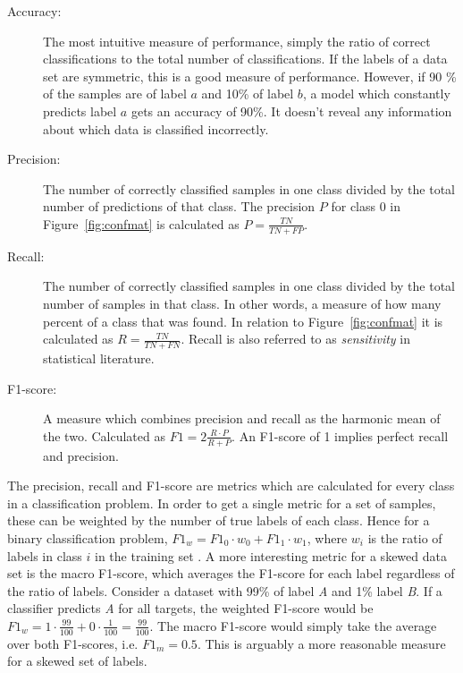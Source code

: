 \begin{description}
    \item[Accuracy:] The most intuitive measure of performance, simply the ratio of correct classifications to the total number of classifications. If the labels of a data set are symmetric, this is a good measure of performance. However, if 90 \%  of the samples are of label $a$ and 10\% of label $b$, a model which constantly predicts label $a$ gets an accuracy of 90\%. It doesn't reveal any information about which data is classified incorrectly. 
    \item[Precision:] The number of correctly classified samples in one class divided by the total number of predictions of that class. The precision $P$ for class 0 in Figure~\ref{fig:confmat} is calculated as $\displaystyle{P = \frac{TN}{TN + FP}}$. 
    \item[Recall:] The number of correctly classified samples in one class divided by the total number of samples in that class. In other words, a measure of how many percent of a class that was found. In relation to Figure~\ref{fig:confmat} it is calculated as $\displaystyle{R = \frac{TN}{TN + FN}}$. Recall is also referred to as \textit{sensitivity} in statistical literature. 
    \item[F1-score:] A measure which combines precision and recall as the harmonic mean of the two. Calculated as $\displaystyle{F1 = 2 \frac{R \cdot P}{R + P}}$. An F1-score of 1 implies perfect recall and precision.
\end{description}

The precision, recall and F1-score are metrics which are calculated for every class in a classification problem. In order to get a single metric for a set of samples, these can be weighted by the number of true labels of each class. Hence for a binary classification problem, $F1_w = F1_0 \cdot w_0 + F1_1 \cdot w_1$, where $w_i$ is the ratio of labels in class $i$ in the training set \citep{Ting2017}. A more interesting metric for a skewed data set is the macro F1-score, which averages the F1-score for each label regardless of the ratio of labels. Consider a dataset with 99\% of label \emph{A} and 1\% label \emph{B}. If a classifier predicts \emph{A} for all targets, the weighted F1-score would be $\displaystyle{F1_w = 1 \cdot \frac{99}{100} + 0 \cdot \frac{1}{100} = \frac{99}{100}}$. The macro F1-score would simply take the average over both F1-scores, i.e. $F1_m = 0.5$. This is arguably a more reasonable measure for a skewed set of labels. 

